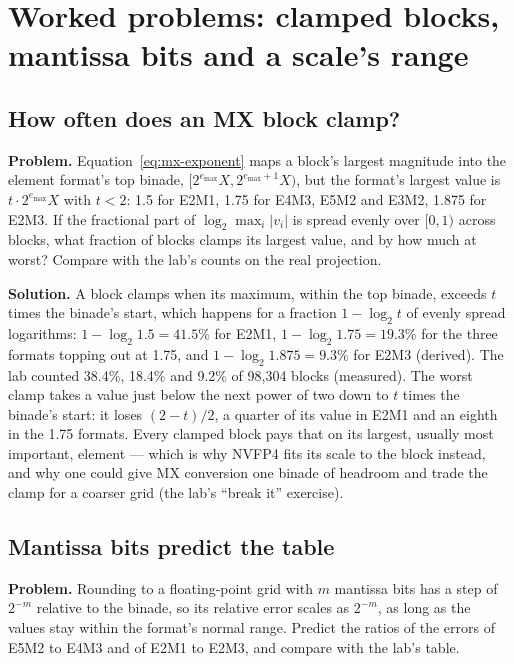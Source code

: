 \section{Worked problems: clamped blocks, mantissa bits and a scale's range}

\subsection{How often does an MX block clamp?}
\textbf{Problem.} Equation~\eqref{eq:mx-exponent} maps a block's largest magnitude
into the element format's top binade, $[2^{e_{\max}}X, 2^{e_{\max}+1}X)$, but the
format's largest value is $t \cdot 2^{e_{\max}}X$ with $t < 2$: 1.5 for E2M1, 1.75
for E4M3, E5M2 and E3M2, 1.875 for E2M3. If the fractional part of
$\log_2 \max_i \lvert v_i\rvert$ is spread evenly over $[0, 1)$ across blocks,
what fraction of blocks clamps its largest value, and by how much at worst?
Compare with the lab's counts on the real projection.

\textbf{Solution.} A block clamps when its maximum, within the top binade, exceeds
$t$ times the binade's start, which happens for a fraction $1 - \log_2 t$ of
evenly spread logarithms: $1 - \log_2 1.5 = 41.5\%$ for E2M1, $1 - \log_2 1.75 =
19.3\%$ for the three formats topping out at 1.75, and $1 - \log_2 1.875 = 9.3\%$
for E2M3 (derived). The lab counted 38.4\%, 18.4\% and 9.2\% of 98,304 blocks
(measured). The worst clamp takes a value just below the next power of two down
to $t$ times the binade's start: it loses $(2 - t)/2$, a quarter of its value in
E2M1 and an eighth in the 1.75 formats. Every clamped block pays that on its
largest, usually most important, element --- which is why NVFP4 fits its scale to
the block instead, and why one could give MX conversion one binade of headroom
and trade the clamp for a coarser grid (the lab's ``break it'' exercise).

\subsection{Mantissa bits predict the table}
\textbf{Problem.} Rounding to a floating-point grid with $m$ mantissa bits has a
step of $2^{-m}$ relative to the binade, so its relative error scales as
$2^{-m}$, as long as the values stay within the format's normal range. Predict
the ratios of the errors of E5M2 to E4M3 and of E2M1 to E2M3, and compare with
the lab's table.

